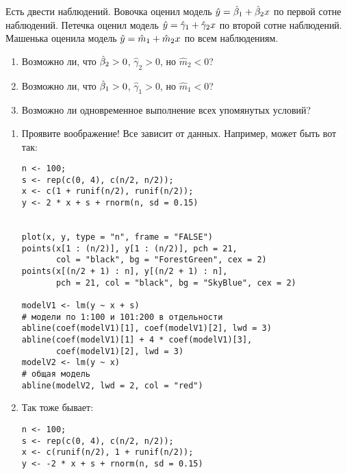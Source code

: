 \begin{problem} %
Есть двести наблюдений. Вовочка оценил модель $\hat{y}=\hat{\beta}_1+\hat{\beta}_2 x$ по первой сотне наблюдений. Петечка оценил модель $\hat{y}=\hat{\gamma}_1+\hat{\gamma}_2 x$ по второй сотне наблюдений. Машенька оценила модель $\hat{y}=\hat{m}_1+\hat{m}_2 x$ по всем наблюдениям.
\begin{enumerate}
\item Возможно ли, что $\hat{\beta}_2>0$, $\hat{\gamma}_2>0$, но $\hat{m}_2<0$?
\item Возможно ли, что $\hat{\beta}_1>0$, $\hat{\gamma}_1>0$, но $\hat{m}_1<0$?
\item Возможно ли одновременное выполнение всех упомянутых условий?
\end{enumerate}


\begin{sol}
\begin{enumerate}
\item Проявите воображение! Все зависит от данных. Например, может быть вот так:

\begin{verbatim}
n <- 100;
s <- rep(c(0, 4), c(n/2, n/2));
x <- c(1 + runif(n/2), runif(n/2));
y <- 2 * x + s + rnorm(n, sd = 0.15)


plot(x, y, type = "n", frame = "FALSE")
points(x[1 : (n/2)], y[1 : (n/2)], pch = 21,
       col = "black", bg = "ForestGreen", cex = 2)
points(x[(n/2 + 1) : n], y[(n/2 + 1) : n],
       pch = 21, col = "black", bg = "SkyBlue", cex = 2)

modelV1 <- lm(y ~ x + s)
# модели по 1:100 и 101:200 в отдельности
abline(coef(modelV1)[1], coef(modelV1)[2], lwd = 3)
abline(coef(modelV1)[1] + 4 * coef(modelV1)[3],
       coef(modelV1)[2], lwd = 3)
modelV2 <- lm(y ~ x)
# общая модель
abline(modelV2, lwd = 2, col = "red")
\end{verbatim}

\begin{minipage}{0.6\textwidth}
\begin{center}

\end{center}
\end{minipage}


\item Так тоже бывает:

\begin{verbatim}
n <- 100;
s <- rep(c(0, 4), c(n/2, n/2));
x <- c(runif(n/2), 1 + runif(n/2));
y <- -2 * x + s + rnorm(n, sd = 0.15)


\end{verbatim}
\end{enumerate}
\end{sol}
\end{problem}
